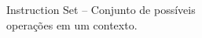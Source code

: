\documentclass[preview]{standalone}
\begin{document}
Instruction Set -- Conjunto de possíveis\\ operações em um contexto.\\
\end{document}
